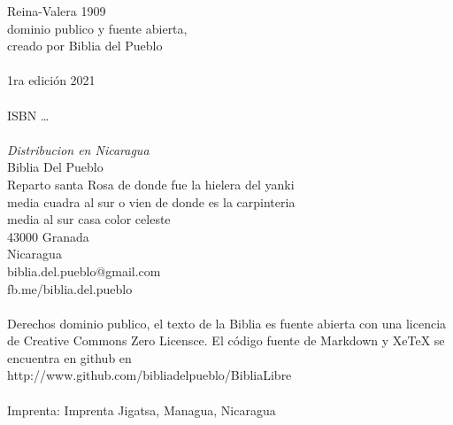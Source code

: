 \hfill\break
Reina-Valera 1909\\
dominio publico y fuente abierta,\\
creado por Biblia del Pueblo\\
~\\
1ra edición 2021\\
~\\
ISBN \dots\\
~\\
\emph{Distribucion en Nicaragua}\\
Biblia Del Pueblo\\
Reparto santa Rosa de donde fue la hielera del yanki\\
media cuadra al sur o vien de donde es la carpinteria\\
media al sur casa color celeste\\
43000 Granada\\
Nicaragua\\
biblia.del.pueblo@gmail.com\\
fb.me/biblia.del.pueblo\\
~\\
Derechos dominio publico, el texto de la Biblia es fuente abierta con
una licencia de Creative Commons Zero Licensce. El código fuente de
Markdown y XeTeX se encuentra en github en\\
http://www.github.com/bibliadelpueblo/BibliaLibre\\
~\\
Imprenta: Imprenta Jigatsa, Managua, Nicaragua\\
